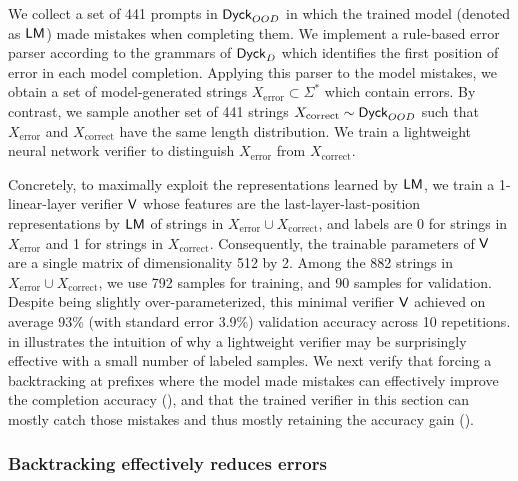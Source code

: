 We collect a set of 441 prompts in $\mathsf{Dyck}_{OOD}$ in which the trained model (denoted as $\mathsf{LM}$) made mistakes when completing them.
We implement a rule-based error parser according to the grammars of $\mathsf{Dyck}_D$ which identifies the first position of error in each model completion.
Applying this parser to the model mistakes, we obtain a set of model-generated strings $X_{\text{error}} \subset \Sigma^*$ which contain errors.
By contrast, we sample another set of 441 strings $X_{\text{correct}} \sim \mathsf{Dyck}_{OOD}$ such that
$X_{\text{error}}$ and $X_{\text{correct}}$ have the same length distribution.
We train a lightweight neural network verifier to distinguish $X_{\text{error}}$ from $X_{\text{correct}}$.

Concretely, to maximally exploit the representations learned by $\mathsf{LM}$,
we train a 1-linear-layer verifier $\mathsf{V}$
whose features are the last-layer-last-position representations by $\mathsf{LM}$ of strings in $X_{\text{error}} \cup X_{\text{correct}}$,
and labels are 0 for strings in $X_{\text{error}}$ and 1 for strings in $X_{\text{correct}}$.
Consequently, the trainable parameters of $\mathsf{V}$ are a single matrix of dimensionality 512 by 2.
Among the 882 strings in $X_{\text{error}} \cup X_{\text{correct}}$, 
we use 792 samples for training, and 90 samples for validation.
Despite being slightly over-parameterized,
this minimal verifier $\mathsf{V}$ achieved on average 93\% (with standard error 3.9\%) validation accuracy across 10 repetitions.
 in  illustrates the intuition of why a lightweight verifier may be surprisingly effective with a small number of labeled samples.
We next verify that forcing a backtracking at prefixes where the model made mistakes can effectively improve the completion accuracy (),
and that the trained verifier in this section can mostly catch those mistakes and thus mostly retaining the accuracy gain ().




\subsubsection{Backtracking effectively reduces errors}
\label{sec:experiments:synthetic:preventing_errors}

